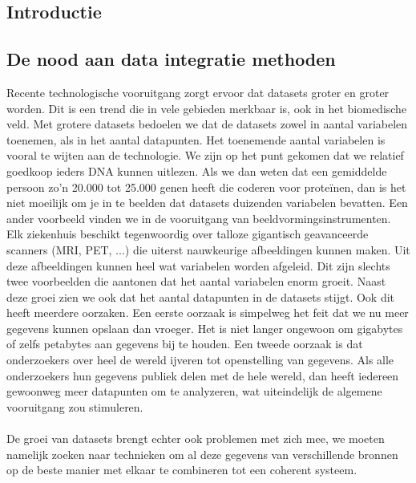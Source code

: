 \begin{abstract*}
\section{Introductie}
\label{cha:D:intro}
\subsection{De nood aan data integratie methoden}
Recente technologische vooruitgang zorgt ervoor dat datasets groter en groter worden. Dit is een trend die in vele gebieden merkbaar is, ook in het biomedische veld. Met grotere datasets bedoelen we dat de datasets zowel in aantal variabelen toenemen, als in het aantal datapunten. Het toenemende aantal variabelen is vooral te wijten aan de technologie. We zijn op het punt gekomen dat we relatief goedkoop ieders DNA kunnen uitlezen. Als we dan weten dat een gemiddelde persoon zo'n 20.000 tot 25.000 genen heeft die coderen voor prote\"inen, dan is het niet moeilijk om je in te beelden dat datasets duizenden variabelen bevatten. Een ander voorbeeld vinden we in de vooruitgang van beeldvormingsinstrumenten. Elk ziekenhuis beschikt tegenwoordig over talloze gigantisch geavanceerde scanners (MRI, PET, ...) die uiterst nauwkeurige afbeeldingen kunnen maken. Uit deze afbeeldingen kunnen heel wat variabelen worden afgeleid. Dit zijn slechts twee voorbeelden die aantonen dat het aantal variabelen enorm groeit. Naast deze groei zien we ook dat het aantal datapunten in de datasets stijgt. Ook dit heeft meerdere oorzaken. Een eerste oorzaak is simpelweg het feit dat we nu meer gegevens kunnen opslaan dan vroeger. Het is niet langer ongewoon om gigabytes of zelfs petabytes aan gegevens bij te houden. Een tweede oorzaak is dat onderzoekers over heel de wereld ijveren tot openstelling van gegevens. Als alle onderzoekers hun gegevens publiek delen met de hele wereld, dan heeft iedereen gewoonweg meer datapunten om te analyzeren, wat uiteindelijk de algemene vooruitgang zou stimuleren. \\ \\
De groei van datasets brengt echter ook problemen met zich mee, we moeten namelijk zoeken naar technieken om al deze gegevens van verschillende bronnen op de beste manier met elkaar te combineren tot een coherent systeem.


\end{abstract*}
